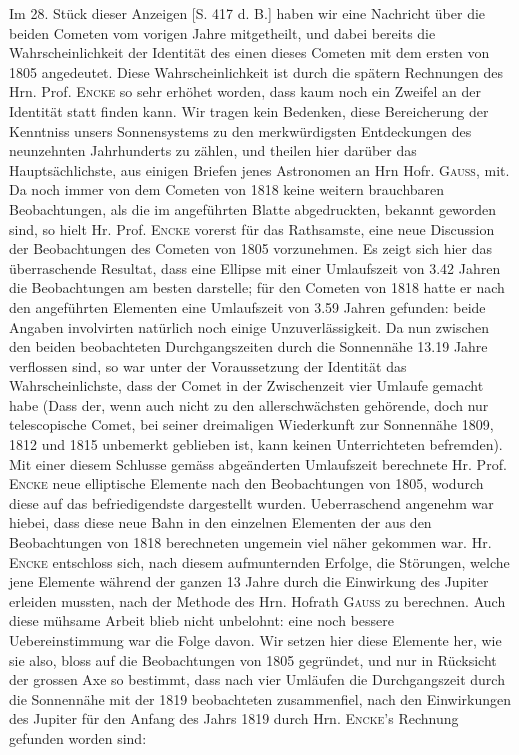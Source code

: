 \par\indent Im 28. Stück dieser Anzeigen [S. 417 d. B.] haben wir eine Nachricht über die beiden
Cometen vom vorigen Jahre mitgetheilt, und dabei bereits die Wahrscheinlichkeit der
Identität des einen dieses Cometen mit dem ersten von 1805 angedeutet. Diese
Wahrscheinlichkeit ist durch die spätern Rechnungen des Hrn. Prof. \textsc{Encke} so sehr
erhöhet worden, dass kaum noch ein Zweifel an der Identität statt finden kann. Wir
tragen kein Bedenken, diese Bereicherung der Kenntniss unsers Sonnensystems zu den
merkwürdigsten Entdeckungen des neunzehnten Jahrhunderts zu zählen, und theilen hier
darüber das Hauptsächlichste, aus einigen Briefen jenes Astronomen an Hrn Hofr.
\textsc{Gauss}, mit. Da noch immer von dem Cometen von 1818 keine weitern brauchbaren
Beobachtungen, als die im angeführten Blatte
abgedruckten, bekannt geworden sind, so hielt Hr. Prof. \textsc{Encke} vorerst für das
Rathsamste, eine neue Discussion der Beobachtungen des Cometen von 1805 vorzunehmen.
Es zeigt sich hier das überraschende Resultat, dass eine Ellipse mit einer
Umlaufszeit von 3.42 Jahren die Beobachtungen am besten darstelle; für den Cometen
von 1818 hatte er nach den angeführten Elementen eine Umlaufszeit von 3.59 Jahren
gefunden: beide Angaben involvirten natürlich noch einige Unzuverlässigkeit. Da nun
zwischen den beiden beobachteten Durchgangszeiten durch die Sonnennähe 13.19 Jahre
verflossen sind, so war unter der Voraussetzung der Identität das Wahrscheinlichste,
dass der Comet in der Zwischenzeit vier Umlaufe gemacht habe (Dass der, wenn auch
nicht zu den allerschwächsten gehörende, doch nur telescopische Comet, bei seiner
dreimaligen Wiederkunft zur Sonnennähe 1809, 1812 und 1815 unbemerkt geblieben ist,
kann keinen Unterrichteten befremden). Mit einer diesem Schlusse gemäss abgeänderten
Umlaufszeit berechnete Hr. Prof. \textsc{Encke} neue elliptische Elemente nach den
Beobachtungen von 1805, wodurch diese auf das befriedigendste dargestellt wurden.
Ueberraschend angenehm war hiebei, dass diese neue Bahn in den einzelnen Elementen
der aus den Beobachtungen von 1818 berechneten ungemein viel näher gekommen war.
Hr. \textsc{Encke} entschloss sich, nach diesem aufmunternden Erfolge, die Störungen, welche
jene Elemente während der ganzen 13 Jahre durch die Einwirkung des Jupiter erleiden
mussten, nach der Methode des Hrn. Hofrath \textsc{Gauss} zu berechnen. Auch diese mühsame
Arbeit blieb nicht unbelohnt: eine noch bessere Uebereinstimmung war die Folge davon.
Wir setzen hier diese Elemente her, wie sie also, bloss auf die Beobachtungen von
1805 gegründet, und nur in Rücksicht der
grossen Axe so bestimmt, dass nach vier Umläufen die Durchgangszeit durch die
Sonnennähe mit der 1819 beobachteten zusammenfiel, nach den Einwirkungen des Jupiter
für den Anfang des Jahrs 1819 durch Hrn. \textsc{Encke}'s Rechnung gefunden worden sind:

